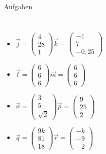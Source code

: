 \documentclass[11pt, aspectratio=169]{beamer}
\begin{document}
\begin{frame}{Aufgaben}
\begin{columns}
\begin{itemize}
				\item $\vec{j} = \left( \begin{array}{c} 4 \\ 28 \\ 1 \end{array} \right) \vec{k} = \left( \begin{array}{c} -1 \\ 7 \\ -0,25 \end{array} \right)$
				\item $\vec{l} = \left( \begin{array}{c} 6 \\ 6 \\ 6 \end{array} \right) \vec{m} = \left( \begin{array}{c} 6 \\ 6 \\ 6 \end{array} \right)$
				\color{green}
				\uncover<2->\checkmark
				\color{black}
				\item $\vec{o} = \left( \begin{array}{c} 3 \\ 5 \\ \sqrt{2} \end{array} \right) \vec{p} = \left( \begin{array}{c} 9 \\ 25 \\ 2 \end{array} \right)$
				\item $\vec{q} = \left( \begin{array}{c} 9k \\ 81 \\ 18 \end{array} \right) \vec{r} = \left( \begin{array}{c} -k \\ -9 \\  -2 \end{array} \right)$
				\color{green}
				\uncover<2->\checkmark
				\color{black}
			\end{itemize}
		\end{columns}
	\end{frame}
\end{document}
